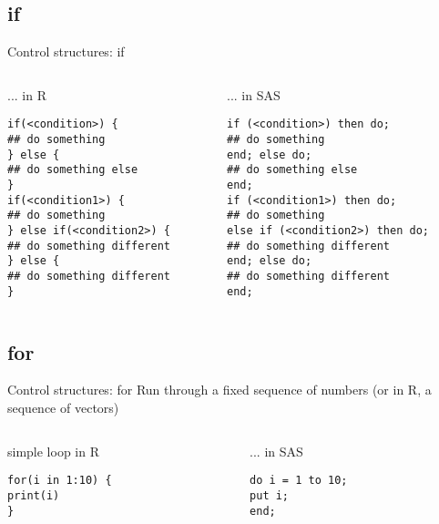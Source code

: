\documentclass[xcolor=table,compress]{beamer}
\begin{document}
\subsection{if}
\begin{frame}[fragile]{Control structures: if}
\begin{columns}
\begin{column}[t]{.48\textwidth}
\pause
\begin{block}{... in R}
\lstset{language=R}
\begin{lstlisting}
if(<condition>) {
## do something
} else {
## do something else
}
if(<condition1>) {
## do something
} else if(<condition2>) {
## do something different
} else {
## do something different
}
\end{lstlisting}
\end{block}
\end{column}
\hfill\pause
\begin{column}[t]{.48\textwidth}
\begin{block}{... in SAS}
\lstset{language=SAS}
\begin{lstlisting}
if (<condition>) then do;
## do something
end; else do;
## do something else
end;
if (<condition1>) then do;
## do something
else if (<condition2>) then do;
## do something different
end; else do;
## do something different
end;
\end{lstlisting}
\end{block}
\end{column}
\end{columns}
\end{frame}




\subsection{for}

\begin{frame}[fragile]{Control structures: for}
Run through a fixed sequence of numbers (or in R, a sequence of vectors)
\begin{columns}
\begin{column}[t]{.48\textwidth}
\pause
\begin{block}{simple loop in R}
\lstset{language=R}
\begin{lstlisting}
for(i in 1:10) {
print(i)
}
\end{lstlisting}
\end{block}
\end{column}
\hfill\pause
\begin{column}[t]{.48\textwidth}
\begin{block}{... in SAS}
\lstset{language=SAS}
\begin{lstlisting}
do i = 1 to 10;
put i;
end;
\end{lstlisting}
\end{block}
\end{column}

\end{columns}
\end{frame}
\end{document}
